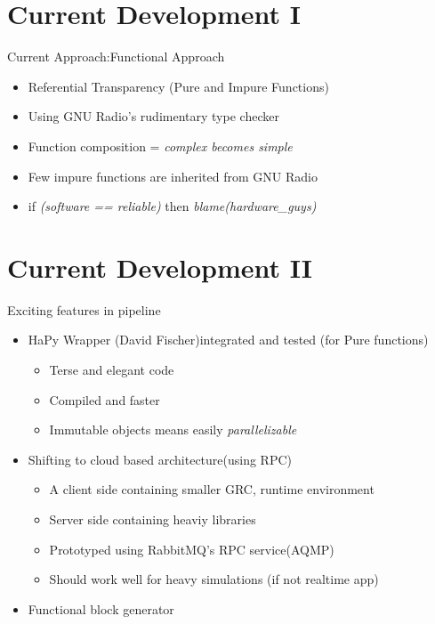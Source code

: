 \documentclass{beamer}
\begin{document}

\section{Current Development I}
\begin{frame}{Current Approach:Functional Approach}

\begin{itemize}
  \item Referential Transparency (Pure and Impure Functions)
  \item Using GNU Radio's rudimentary type checker
  \item Function composition = \textit{complex becomes simple}
  \item Few impure functions are inherited from GNU Radio
  \item if \textit{(software == reliable)} then \textit{blame(hardware\_guys)}
\end{itemize}
\vskip 1cm
\end{frame}

\section{Current Development II}
\begin{frame}{Exciting features in pipeline}

\begin{itemize}
  \item HaPy Wrapper (David Fischer)integrated and tested (for Pure functions)
  \begin{itemize}
    \item Terse and elegant code
    \item Compiled and faster
    \item Immutable objects means easily \textit{parallelizable}
  \end{itemize}
  \item Shifting to cloud based architecture(using RPC)
  \begin{itemize}
    \item A client side containing smaller GRC, runtime environment
    \item Server side containing heaviy libraries
    \item Prototyped using RabbitMQ's RPC service(AQMP)
    \item Should work well for heavy simulations (if not realtime app)
  \end{itemize}
  \item Functional block generator
\end{itemize}
\vskip 1cm
\end{frame}
\end{document}
